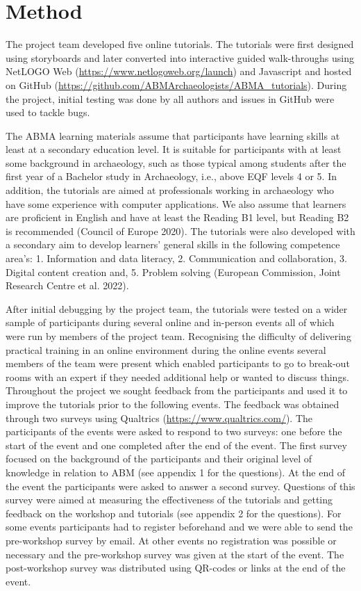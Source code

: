 \documentclass[
]{article}
\begin{document}
\hypertarget{method}{%
\section{Method}\label{method}}

The project team developed five online tutorials. The tutorials were first designed using storyboards and later converted into interactive guided walk-throughs using NetLOGO Web (\url{https://www.netlogoweb.org/launch}) and Javascript and hosted on GitHub (\url{https://github.com/ABMArchaeologists/ABMA_tutorials}). During the project, initial testing was done by all authors and issues in GitHub were used to tackle bugs.

The ABMA learning materials assume that participants have learning skills at least at a secondary education level. It is suitable for participants with at least some background in archaeology, such as those typical among students after the first year of a Bachelor study in Archaeology, i.e., above EQF levels 4 or 5. In addition, the tutorials are aimed at professionals working in archaeology who have some experience with computer applications. We also assume that learners are proficient in English and have at least the Reading B1 level, but Reading B2 is recommended (Council of Europe 2020). The tutorials were also developed with a secondary aim to develop learners' general skills in the following competence area's: 1. Information and data literacy, 2. Communication and collaboration, 3. Digital content creation and, 5. Problem solving (European Commission, Joint Research Centre et al. 2022).

After initial debugging by the project team, the tutorials were tested on a wider sample of participants during several online and in-person events all of which were run by members of the project team. Recognising the difficulty of delivering practical training in an online environment during the online events several members of the team were present which enabled participants to go to break-out rooms with an expert if they needed additional help or wanted to discuss things. Throughout the project we sought feedback from the participants and used it to improve the tutorials prior to the following events. The feedback was obtained through two surveys using Qualtrics (\url{https://www.qualtrics.com/}). The participants of the events were asked to respond to two surveys: one before the start of the event and one completed after the end of the event. The first survey focused on the background of the participants and their original level of knowledge in relation to ABM (see appendix 1 for the questions). At the end of the event the participants were asked to answer a second survey. Questions of this survey were aimed at measuring the effectiveness of the tutorials and getting feedback on the workshop and tutorials (see appendix 2 for the questions). For some events participants had to register beforehand and we were able to send the pre-workshop survey by email. At other events no registration was possible or necessary and the pre-workshop survey was given at the start of the event. The post-workshop survey was distributed using QR-codes or links at the end of the event.
\end{document}
